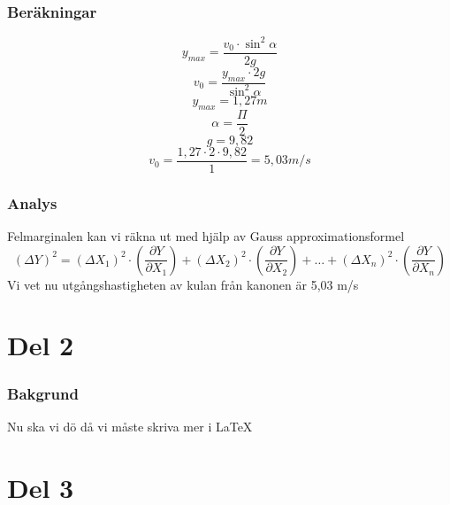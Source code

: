 \documentclass[11p]{article}
\begin{document}
        \subsubsection{Beräkningar}
            \begin{equation}
                y_{max}=\frac{v_0 \cdot \sin^2 \alpha}{2g}
                \label{eq:eq1}
            \end{equation}
            \begin{equation}
                v_0=\frac{y_{max} \cdot 2g}{\sin^2 \alpha}
                \label{eq:eq2}
            \end{equation}
            \begin{equation}
                y_{max}=1,27 m
                \label{eq:eq3}
            \end{equation}
            \begin{equation}
                \alpha=\frac{\Pi}{2}
                \label{eq:eq4}
            \end{equation}
            \begin{equation}
                g=9,82
                \label{eq:eq5}
            \end{equation}
            \begin{equation}
                v_0=\frac{1,27 \cdot 2 \cdot 9,82}{1}=5,03 m/s
                \label{eq:eq6}
            \end{equation}
        \subsubsection{Analys}
    Felmarginalen kan vi räkna ut med hjälp av Gauss approximationsformel
    \begin{equation}
        (\Delta Y)^2=(\Delta X_1)^2 \cdot (\frac{\partial Y}{\partial X_1}) +
    (\Delta X_2)^2 \cdot (\frac{\partial Y}{\partial X_2}) + \dots +
    (\Delta X_n)^2 \cdot (\frac{\partial Y}{\partial X_n})
        \label{eq:eq7}
    \end{equation}
            Vi vet nu utgångshastigheten av kulan från kanonen är 5,03 m/s

    \section{Del 2}
        \subsubsection{Bakgrund}
            \Huge Nu ska vi dö då vi måste skriva mer i \LaTeX
    \section{Del 3}

\end{document}
